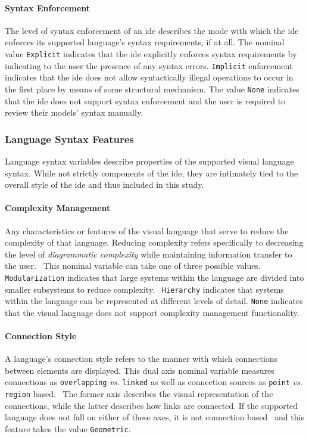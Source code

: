 \paragraph{Syntax Enforcement} The level of syntax enforcement of an \ac{ide}
describes the mode with which the \ac{ide} enforces its supported language's
syntax requirements, if at all. The nominal value \texttt{Explicit}
indicates that the \ac{ide} explicitly enforces syntax requirements by
indicating to the user the presence of any syntax errors. \texttt{Implicit}
enforcement indicates that the \ac{ide} does not allow syntactically illegal
operations to occur in the first place by means of some structural
mechanism. The value \texttt{None} indicates that the \ac{ide} does not support
syntax enforcement and the user is required to review their models' syntax
manually.


\subsubsection{Language Syntax Features} \label{subsubsec:languagesyntax}

Language syntax variables describe properties of the supported visual
language syntax. While not strictly components of the \ac{ide}, they are
intimately tied to the overall style of the \ac{ide} and thus included in this
study.


\paragraph{Complexity Management} Any characteristics or features of the
visual language that serve to reduce the complexity of that language.
Reducing complexity refers specifically to decreasing the level of
\emph{diagrammatic complexity} while maintaining information transfer to
the user.~\cite{moody2009} This nominal variable can take one of three
possible values. \texttt{Modularization} indicates that large systems
within the language are divided into smaller subsystems to reduce
complexity.~\cite{moody2009} \texttt{Hierarchy} indicates that systems
within the language can be represented at different levels of detail.
\cite{moody2009} \texttt{None} indicates that the visual language does not
support complexity management functionality.


\paragraph{Connection Style} A language's connection style refers to the
manner with which connections between elements are displayed. This dual
axis nominal variable measures connections as \texttt{overlapping}
\emph{vs.} \texttt{linked} as well as connection sources as \texttt{point}
\emph{vs.} \texttt{region} based.~\cite{costagliola2002} The former axis
describes the visual representation of the connections, while the latter
describes how links are connected. If the supported language does not fall
on either of these axes, it is not connection based~\cite{costagliola2002}
and this feature takes the value \texttt{Geometric}.



